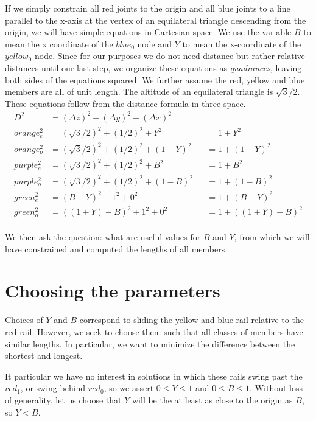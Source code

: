 \documentclass[11pt]{article}
\begin{document}
 If we simply constrain all red joints to the origin and all blue joints to a line parallel to the x-axis at the vertex of an equilateral
 triangle descending from the origin, we will have simple equations in Cartesian space. We use the variable $B$ to mean the x coordinate
 of the $blue_0$ node and $Y$ to mean the x-coordinate of the $yellow_0$ node. Since for our purposes we do not need distance but
 rather relative distances
 until our last step, we organize these equations as \emph{quadrances}, leaving both sides of the equations squared.
 We further assume the red, yellow and blue members are all of unit length. The altitude of an equilateral triangle is $\sqrt{3}/2$.
 These equations follow from the distance formula in three space.
 \begin{align*}
   D^2 &= (\Delta z)^2 + (\Delta y)^2 + (\Delta x)^2 \\
 orange_e^2 &= (\sqrt{3}/2)^2 + (1/2)^2 + Y^2 & &= 1 + Y^2\\
 orange_o^2 &= (\sqrt{3}/2)^2 + (1/2)^2 + (1-Y)^2 & &= 1 + (1-Y)^2\\
 purple_e^2 &= (\sqrt{3}/2)^2 + (1/2)^2 + B^2 & &= 1 + B^2\\
 purple_o^2 &= (\sqrt{3}/2)^2 + (1/2)^2 + (1-B)^2 & &=  1+ (1-B)^2\\
 green_e^2 &= (B - Y)^2 + 1^2 + 0^2 & &= 1 + (B - Y)^2 \\ 
 green_o^2 &= ((1+Y) - B)^2 + 1^2 + 0^2 & &= 1 + ((1+Y) - B)^2 \\ 
\end{align*}

 We then ask the question: what are useful values for $B$ and $Y$, from which we will have constrained and computed the lengths of all
 members.

 \section{Choosing the parameters}

 Choices of $Y$ and $B$ correspond to sliding the yellow and blue rail relative to the red rail. However, we seek to choose them such that all
 classes of members have similar lengths. In particular, we want to minimize the difference between the shortest and longest.

 It particular we have no interest in solutions in which these rails swing past the $red_1$, or swing behind $red_0$, so we
 assert $0 \leq Y \leq 1$ and $0 \leq B \leq 1$. Without loss of generality, let us choose that $Y$ will be the at least as close to the origin as $B$,
 so $Y  < B$.
\end{document}
